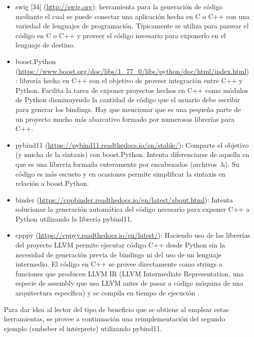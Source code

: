 \begin{itemize}
    \item swig [34] (\url{http://swig.org}): herramienta para la generación de
    código mediante el cual se puede conectar una aplicación hecha en C o C++
    con una variedad de lenguajes de programación. Típicamente se utiliza para
    parsear el código en C o C++ y proveer el código necesario para exponerlo
    en el lenguaje de destino.

    \item boost.Python
    (\url{https://www.boost.org/doc/libs/1_77_0/libs/python/doc/html/index.html}):
    librería hecha en C++ con el objetivo de proveer integración entre C++ y
    Python. Facilita la tarea de exponer proyectos hechos en C++ como módulos
    de Python disminuyendo la cantidad de código que el usuario debe escribir
    para generar los bindings. Hay que mencionar que es una pequeña parte de un
    proyecto mucho más abarcativo formado por numerosas librerías para C++.

    \item pybind11 (\url{https://pybind11.readthedocs.io/en/stable/}): Comparte
    el objetivo (y mucha de la sintaxis) con boost.Python.  Intenta
    diferenciarse de aquella en que es una librería formada enteramente por
    encabezados (archivos .h). Su código es más escueto y en ocasiones permite
    simplificar la sintaxis en relación a boost.Python. 

    \item binder (\url{https://cppbinder.readthedocs.io/en/latest/about.html}):
    Intenta solucionar la generación automática del código necesario para
    exponer C++ a Python utilizando la librería pybind11.

    \item cpppy (\url{https://cppyy.readthedocs.io/en/latest/}): Haciendo uso
    de las librerías del proyecto LLVM permite ejecutar código C++ desde Python
    sin la necesidad de generación previa de bindings ni del uso de un lenguaje
    intermedio. El código en C++ se provee directamente como strings a
    funciones que producen LLVM IR (LLVM Intermediate Representation, una
    especie de assembly que usa LLVM antes de pasar a código máquina de una
    arquitectura específica) y se compila en tiempo de ejecución
    \cite{lavrijsen}.
\end{itemize}

Para dar idea al lector del tipo de beneficio que se obtiene al emplear estas
herramientas, se provee a continuación una reimplementación del segundo ejemplo
(embeber el intérprete) utilizando pybind11.

